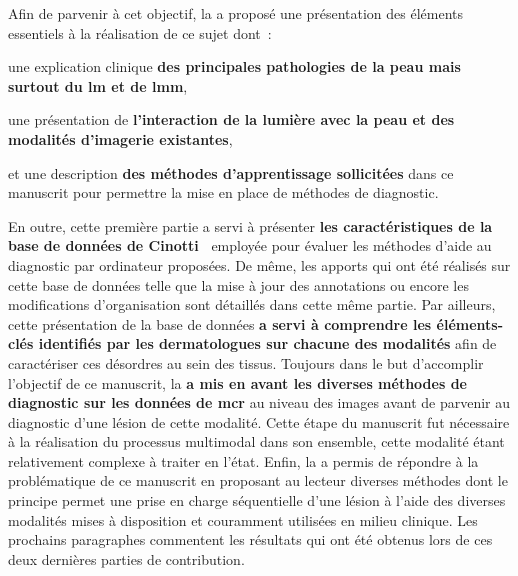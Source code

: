 Afin de parvenir à cet objectif, la  a proposé une présentation des éléments essentiels à la réalisation de ce sujet dont~:
\begin{inlinerate}
    \item une explication clinique \textbf{des principales pathologies de la peau mais surtout du \gls{lm} et de \gls{lmm}},
    \item une présentation de \textbf{l'interaction de la lumière avec la peau et des modalités d'imagerie existantes},
    \item et une description \textbf{des méthodes d'apprentissage sollicitées} dans ce manuscrit pour permettre la mise en place de méthodes de diagnostic.
\end{inlinerate} 
En outre, cette première partie a servi à présenter \textbf{les caractéristiques de la base de données de Cinotti~} employée pour évaluer les méthodes d'aide au diagnostic par ordinateur proposées. De même, les apports qui ont été réalisés sur cette base de données telle que la mise à jour des annotations ou encore les modifications d'organisation sont détaillés dans cette même partie.
Par ailleurs, cette présentation de la base de données \textbf{a servi à comprendre les éléments-clés identifiés par les dermatologues sur chacune des modalités} afin de caractériser ces désordres au sein des tissus. Toujours dans le but d'accomplir l'objectif de ce manuscrit, la  \textbf{a mis en avant les diverses méthodes de diagnostic sur les données de \gls{mcr}} au niveau des images avant de parvenir au diagnostic d'une lésion de cette modalité. Cette étape du manuscrit fut nécessaire à la réalisation du processus multimodal dans son ensemble, cette modalité étant relativement complexe à traiter en l'état. Enfin, la  a permis de répondre à la problématique de ce manuscrit en proposant au lecteur diverses méthodes dont le principe permet une prise en charge séquentielle d'une lésion à l'aide des diverses modalités mises à disposition et couramment utilisées en milieu clinique. Les prochains paragraphes commentent les résultats qui ont été obtenus lors de ces deux dernières parties de contribution.\par

